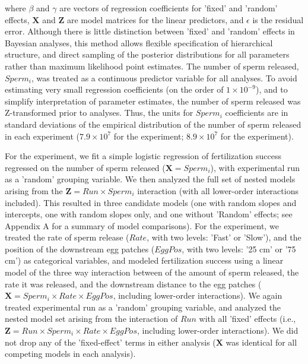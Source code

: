 \documentclass{article}
\begin{document}
	\noindent where $\beta$ and $\gamma$ are vectors of regression coefficients for 'fixed' and 'random' effects, $\mathbf{X}$ and $\mathbf{Z}$ are model matrices for the linear predictors, and $\epsilon$ is the residual error. Although there is little distinction between 'fixed' and 'random' effects in Bayesian analyses, this method allows flexible specification of hierarchical structure, and direct sampling of the posterior distributions for all parameters rather than maximum likelihood point estimates. The number of sperm released, $Sperm_i$, was treated as a continuous predictor variable for all analyses. To avoid estimating very small regression coefficients (on the order of $1 \times 10^{-9}$), and to simplify interpretation of parameter estimates, the number of sperm released was Z-transformed prior to analyses. Thus, the units for $Sperm_i$ coefficients are in standard deviations of the empirical distribution of the number of sperm released in each experiment ($7.9 \times 10^{7}$ for the  experiment; $8.9 \times 10^{7}$ for the  experiment). 

	For the  experiment, we fit a simple logistic regression of fertilization success regressed on the number of sperm released ($\mathbf{X} = Sperm_i$), with experimental run as a 'random' grouping variable. We then analyzed the full set of nested models arising from the $\mathbf{Z} = Run \times Sperm_i$ interaction (with all lower-order interactions included). This resulted in three candidate models (one with random slopes and intercepts, one with random slopes only, and one without 'Random' effects; see Appendix A for a summary of model comparisons). For the  experiment, we treated the rate of sperm release ($Rate$, with two levels: 'Fast' or 'Slow'), and the position of the downstream egg patches ($EggPos$, with two levels: '25 cm' or '75 cm') as categorical variables, and modeled fertilization success using a linear model of the three way interaction between of the amount of sperm released, the rate it was released, and the downstream distance to the egg patches ($ \mathbf{X} = Sperm_i \times Rate \times EggPos$, including lower-order interactions). We again treated experimental run as a 'random' grouping variable, and analyzed the nested model set arising from the interaction of $Run$ with all 'fixed' effects (i.e., $\mathbf{Z} = Run \times Sperm_i \times Rate \times EggPos$, including lower-order interactions). We did not drop any of the 'fixed-effect' terms in either analysis ($\mathbf{X}$ was identical for all competing models in each analysis).
\end{document}
